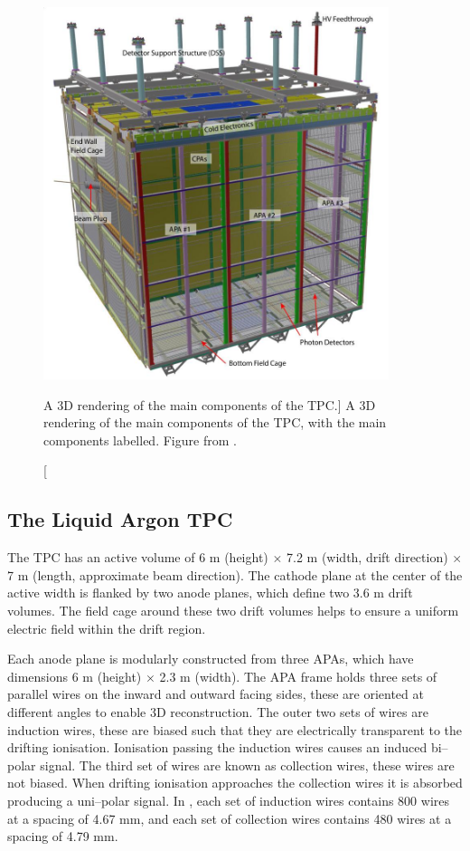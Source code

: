 \begin{figure}

	\centering

	\includegraphics[width=0.9\textwidth]{figures/pdsp_tpc.jpg}

	\caption
	[A 3D rendering of the main components of the \protodune{} TPC.]
	{A 3D rendering of the main components of the \protodune{} TPC, with the main
	components labelled. Figure from \cite{Abi:2017aow}.}

	\label{fig:pdsp_tpc}

\end{figure}

\subsection{The Liquid Argon TPC}

The \protodune{} TPC has an active volume of 6 m (height) $\times$ 7.2 m (width,
drift direction) $\times$ 7 m (length, approximate beam direction). The cathode 
plane at the center of the active width is flanked by two anode planes, which 
define two 3.6 m drift volumes. The field cage around these two drift volumes
helps to ensure a uniform electric field within the drift region.

Each anode plane is modularly constructed from three APAs, which have dimensions
6 m (height) $\times$ 2.3 m (width). The APA frame holds three sets of parallel
wires on the inward and outward facing sides, these are oriented at different 
angles to enable 3D reconstruction. The outer two sets of wires are induction
wires, these are biased such that they are electrically transparent to the 
drifting ionisation. Ionisation passing the induction wires causes an induced 
bi--polar signal. The third set of wires are known as collection wires, these
wires are not biased. When drifting ionisation approaches the collection wires 
it is absorbed producing a uni--polar signal. In \protodune{}, each set of 
induction wires contains 800 wires at a spacing of 4.67 mm, and each set of 
collection wires contains 480 wires at a spacing of 4.79 mm. 

